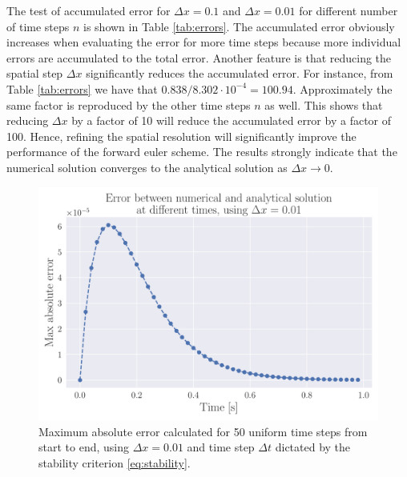 \documentclass[12pt]{extarticle}
\begin{document}
The test of accumulated error for $\Delta x=0.1$ and $\Delta x=0.01$ for different number of time steps $n$ is shown in Table \ref{tab:errors}. The accumulated error obviously increases when evaluating the error for more time steps because more individual errors are accumulated to the total error. Another feature is that reducing the spatial step $\Delta x$ significantly reduces the accumulated error. For instance, from Table \ref{tab:errors} we have that $0.838/8.302\cdot 10^{-4}=100.94$. Approximately the same factor is reproduced by the other time steps $n$ as well. This shows that reducing $\Delta x$ by a factor of 10 will reduce the accumulated error by a factor of 100. Hence, refining the spatial resolution will significantly improve the performance of the forward euler scheme. The results strongly indicate that the numerical solution converges to the analytical solution as $\Delta x \rightarrow 0$. 

\begin{figure}[h]
	\centering
	\includegraphics[scale=0.5]{../output/plots/error_FE}
	\caption{Maximum absolute error calculated for 50 uniform time steps from start to end, using $\Delta x=0.01$ and time step $\Delta t$ dictated by the stability criterion \ref{eq:stability}.}
	\label{fig:error_dx001_n50}
\end{figure}
\end{document}
